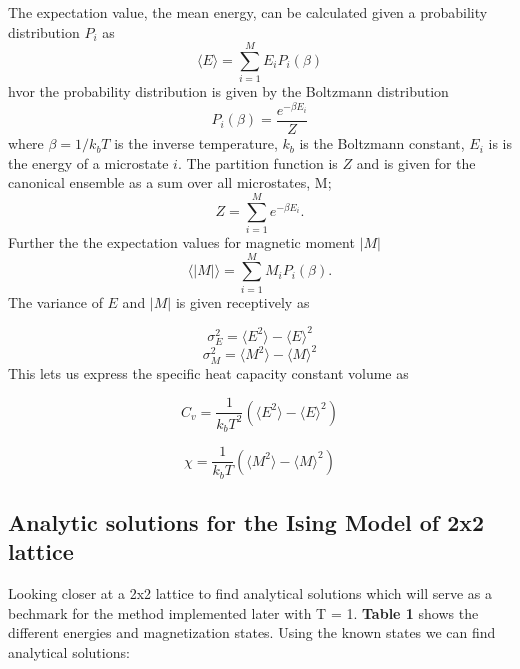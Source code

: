 \documentclass[twoside,twocolumn]{article}
\begin{document}
The expectation value, the mean energy, can be calculated given a probability distribution $P_i$ as
\begin{equation}
\langle E \rangle=  \sum_{i= 1}^{M} E_iP_i(\beta)
\end{equation}
hvor the probability distribution is given by the Boltzmann distribution
\[
P_i(\beta) = \frac{ e^{-\beta E_i}}{Z}
\]
where $\beta = 1/k_bT$ is the inverse temperature, $k_b$ is the Boltzmann constant, $E_i$ is is the energy of a microstate $i$. The partition function is $Z$ and is given for the canonical ensemble as a sum over all microstates, M; 
\[
Z = \sum_{i= 1}^{M} e^{-\beta E_i}.
\]
Further the the expectation values for magnetic moment $|M|$
\begin{equation}
\langle |M| \rangle=  \sum_{i= 1}^{M} M_iP_i(\beta).
\end{equation}
The variance of $E$ and $|M|$ is given receptively as 

\[
 \sigma_E^2 = \langle E^2 \rangle -\langle E \rangle^2
 \]
 \[
 \sigma_M^2 = \langle M^2 \rangle -\langle M \rangle^2
\]
This lets us express the specific heat capacity constant volume as

\begin{equation}
 C_v = \frac{1}{k_bT^2} (\langle E^2 \rangle -\langle E \rangle^2)
\end{equation}

\begin{equation}
 \chi = \frac{1}{k_bT} (\langle M^2 \rangle -\langle M \rangle^2)
\end{equation}
\subsection{ Analytic solutions for the Ising Model of 2x2 lattice }
Looking closer at a 2x2 lattice to find analytical solutions which will serve as a bechmark for the method implemented later with T = 1. \textbf{Table 1} shows the different energies and magnetization states. Using the known states we can find analytical solutions:
\end{document}
